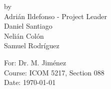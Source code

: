 \begin{titlepage}
\begin{center}
by \\[0.5cm]

Adri\'{a}n Ildefonso - Project Leader \\
Daniel Santiago \\
Neli\'{a}n Col\'{o}n \\
Samuel Rodr\'{i}guez \\

\vfill

For: Dr. M. Jim\'{e}nez \\
Course: ICOM 5217, Section 088 \\
Date: \today

\end{center}

\end{titlepage}
